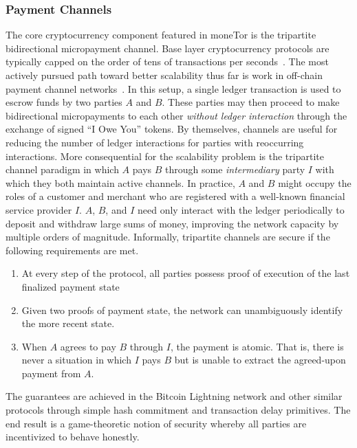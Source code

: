 \subsubsection{Payment Channels} The core cryptocurrency component featured in
moneTor is the tripartite bidirectional micropayment channel. Base layer
cryptocurrency protocols are typically capped on the order of tens of
transactions per seconds~\cite{team2018blockchain}. The most actively pursued
path toward better scalability thus far is work in off-chain payment channel
networks~\cite{poon2016bitcoin}. In this setup, a single ledger transaction is
used to escrow funds by two parties $A$ and $B$. These parties may then proceed
to make bidirectional micropayments to each other \emph{without ledger
  interaction} through the exchange of signed ``I Owe You'' tokens. By
themselves, channels are useful for reducing the number of ledger interactions
for parties with reoccurring interactions. More consequential for the
scalability problem is the tripartite channel paradigm in which $A$ pays $B$
through some \emph{intermediary} party $I$ with which they both maintain active
channels. In practice, $A$ and $B$ might occupy the roles of a customer and
merchant who are registered with a well-known financial service provider
$I$. $A$, $B$, and $I$ need only interact with the ledger periodically to
deposit and withdraw large sums of money, improving the network capacity by
multiple orders of magnitude. Informally, tripartite channels are secure if the
following requirements are met.

\begin{enumerate}
\item At every step of the protocol, all parties possess proof of execution of
  the last finalized payment state
\item Given two proofs of payment state, the network can unambiguously identify
  the more recent state.
\item When $A$ agrees to pay $B$ through $I$, the payment is atomic. That is,
  there is never a situation in which $I$ pays $B$ but is unable to extract the
  agreed-upon payment from $A$.
\end{enumerate}

The guarantees are achieved in the Bitcoin Lightning network and other similar
protocols through simple hash commitment and transaction delay primitives. The
end result is a game-theoretic notion of security whereby all parties are
incentivized to behave honestly.

